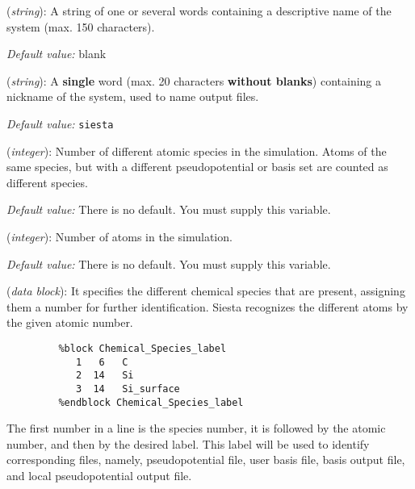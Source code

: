 \documentclass[11pt]{article}
\begin{document}
\begin{description}
\itemsep 10pt
\parsep 0pt

\item[{\bf SystemName}] ({\it string}): 
A string of one or several words containing a descriptive
name of the system (max. 150 characters). 

{\it Default value:} blank

\item[{\bf SystemLabel}] ({\it string}): 
A {\bf single} word (max. 20 characters {\bf without blanks})
containing a nickname of the system, used to name output files.

{\it Default value:} {\tt siesta}

\item[{\bf NumberOfSpecies}] ({\it integer}): 
Number of different atomic species in the simulation. 
Atoms of the same species, but with a different 
pseudopotential or basis set are counted as different species.

{\it Default value:} There is no default. You must supply this variable.

\item[{\bf NumberOfAtoms}] ({\it integer}): 
Number of atoms in the simulation.

{\it Default value:} There is no default. You must supply this variable.

\item[{\bf ChemicalSpeciesLabel}] ({\it data block}): 
It specifies the different chemical species that are present, 
assigning them a number for further identification. 
{\sc Siesta} recognizes the different atoms by the given atomic number.

\begin{verbatim}
         %block Chemical_Species_label
            1   6   C 
            2  14   Si
            3  14   Si_surface
         %endblock Chemical_Species_label
\end{verbatim}

The first number in a line is the species number, it is followed by the
atomic number, and then by the desired label. This label will be used
to identify corresponding files, namely, pseudopotential file, user basis
file, basis output file, and local pseudopotential output file.


\end{description}
\end{document}
